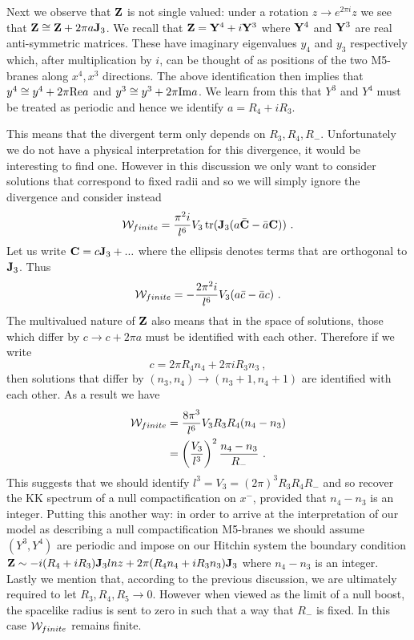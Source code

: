 \documentclass[12pt]{article}
\newcommand{\tr}{\operatorname{tr}}
\newcommand{\nn}{\nonumber}
\numberwithin{equation}{section}
\begin{document}
Next we observe that ${\bf Z}$ is not single valued: under a rotation $z\to e^{2\pi i}z$ we see that  ${\bf Z}\cong {\bf Z} + 2\pi    a {\bf J}_3 $. We recall that ${\bf Z} = {\bf Y}^4+i{\bf Y}^3$ where ${\bf Y}^4$ and ${\bf Y}^3$ are real anti-symmetric matrices. These have imaginary eigenvalues $y_4$ and $y_3$ respectively which, after multiplication by $i$, can be thought of as positions of the two M5-branes along $x^4,x^3$ directions. The above identification then implies that $y^4\cong y^4 + 2\pi {\rm Re} a$ and $y^3\cong y^3 + 2\pi{\rm Im} a$. We learn from this that $Y^3$ and $Y^4$ must be treated as periodic and hence we identify $a =   R_4+ iR_3$.  

This means that  the divergent term  only depends on $R_3,R_4, R_-$.  Unfortunately we do not have a physical interpretation for this divergence, it would be interesting to find one. However in this discussion we only want to consider solutions that correspond to fixed radii and so we will simply ignore the divergence and consider instead
 \begin{equation}
 {\cal W}_{finite} =    \frac{\pi^2i}{ l^6}V_3  \tr({\bf J}_3 (a\bar{\bf C}-\bar a{\bf C}))\ .
 \end{equation}
Let us write ${\bf C}=c{\bf J}_3+...$ where the ellipsis denotes terms that are orthogonal to ${\bf J}_3$. Thus
\begin{equation}
{\cal W}_{finite} =  -\frac{2\pi^2i}{ l^6}V_3  (a\bar c-\bar ac)\ .
 \end{equation}
 The multivalued nature of ${\bf Z}$ also means that in the space of solutions, those which differ by $c\to c+2\pi  a$ must be identified with each other.  Therefore if we write
\begin{equation}
c =  2\pi   R_4n_4+ 2\pi iR_3n_3 \ ,
\end{equation}
then solutions that differ by $(n_3,n_4)\to (n_3+1,n_4+1)$ are identified with each other. As a result we have
\begin{align}
{\cal W}_{finite} &=  \frac{8\pi^3}{l^6}V_3 R_3R_4(n_4-n_3) \nn\\
&=  \left(\frac{V_3}{l^3}\right)^2
\frac{n_4-n_3}{   R_-}\ .
\end{align}
This suggests that we should identify $l^3 =  V_3=(2\pi)^3R_3R_4R_-$ and so  recover the KK spectrum of a null compactification on $x^-$, provided that $n_4-n_3$ is an    integer. Putting this another way: in order to arrive at the interpretation of our model as describing a null compactification M5-branes we should assume $(Y^3,Y^4)$ are periodic and  impose on our Hitchin system the boundary condition ${\bf Z} \sim   -i(R_4+iR_3)    {\bf J}_3 ln z + 2\pi   (R_4n_4+   iR_3n_3 ) {\bf J}_3 $ where $n_4-n_3$ is an   integer. Lastly we mention that, according to the previous discussion, we are ultimately required to let $R_3,R_4,R_5\to 0$. However  when viewed as the limit of a null boost, the spacelike radius is sent to zero in such that a way that  $R_-$ is fixed. In this case ${\cal W}_{finite}$ remains finite. 
 
\end{document}
